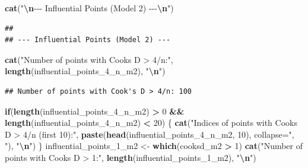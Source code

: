 \documentclass[
]{article}
\newenvironment{Shaded}{\begin{snugshade}}{\end{snugshade}}
\newcommand{\AttributeTok}[1]{\textcolor[rgb]{0.13,0.29,0.53}{#1}}
\newcommand{\ControlFlowTok}[1]{\textcolor[rgb]{0.13,0.29,0.53}{\textbf{#1}}}
\newcommand{\DecValTok}[1]{\textcolor[rgb]{0.00,0.00,0.81}{#1}}
\newcommand{\FunctionTok}[1]{\textcolor[rgb]{0.13,0.29,0.53}{\textbf{#1}}}
\newcommand{\NormalTok}[1]{#1}
\newcommand{\OtherTok}[1]{\textcolor[rgb]{0.56,0.35,0.01}{#1}}
\newcommand{\SpecialCharTok}[1]{\textcolor[rgb]{0.81,0.36,0.00}{\textbf{#1}}}
\newcommand{\StringTok}[1]{\textcolor[rgb]{0.31,0.60,0.02}{#1}}
\begin{document}
\begin{Shaded}
\begin{Highlighting}[]
    \FunctionTok{cat}\NormalTok{(}\StringTok{"}\SpecialCharTok{\textbackslash{}n}\StringTok{{-}{-}{-} Influential Points (Model 2) {-}{-}{-}}\SpecialCharTok{\textbackslash{}n}\StringTok{"}\NormalTok{)}
\end{Highlighting}
\end{Shaded}

\begin{verbatim}
## 
## --- Influential Points (Model 2) ---
\end{verbatim}

\begin{Shaded}
\begin{Highlighting}[]
    \FunctionTok{cat}\NormalTok{(}\StringTok{"Number of points with Cook\textquotesingle{}s D \textgreater{} 4/n:"}\NormalTok{, }\FunctionTok{length}\NormalTok{(influential\_points\_4\_n\_m2), }\StringTok{"}\SpecialCharTok{\textbackslash{}n}\StringTok{"}\NormalTok{)}
\end{Highlighting}
\end{Shaded}

\begin{verbatim}
## Number of points with Cook's D > 4/n: 100
\end{verbatim}

\begin{Shaded}
\begin{Highlighting}[]
    \ControlFlowTok{if}\NormalTok{(}\FunctionTok{length}\NormalTok{(influential\_points\_4\_n\_m2) }\SpecialCharTok{\textgreater{}} \DecValTok{0} \SpecialCharTok{\&\&} \FunctionTok{length}\NormalTok{(influential\_points\_4\_n\_m2) }\SpecialCharTok{\textless{}} \DecValTok{20}\NormalTok{) \{}
        \FunctionTok{cat}\NormalTok{(}\StringTok{"Indices of points with Cook\textquotesingle{}s D \textgreater{} 4/n (first 10):"}\NormalTok{, }\FunctionTok{paste}\NormalTok{(}\FunctionTok{head}\NormalTok{(influential\_points\_4\_n\_m2, }\DecValTok{10}\NormalTok{), }\AttributeTok{collapse=}\StringTok{", "}\NormalTok{), }\StringTok{"}\SpecialCharTok{\textbackslash{}n}\StringTok{"}\NormalTok{)}
\NormalTok{    \}}
\NormalTok{    influential\_points\_1\_m2 }\OtherTok{\textless{}{-}} \FunctionTok{which}\NormalTok{(cooksd\_m2 }\SpecialCharTok{\textgreater{}} \DecValTok{1}\NormalTok{)}
    \FunctionTok{cat}\NormalTok{(}\StringTok{"Number of points with Cook\textquotesingle{}s D \textgreater{} 1:"}\NormalTok{, }\FunctionTok{length}\NormalTok{(influential\_points\_1\_m2), }\StringTok{"}\SpecialCharTok{\textbackslash{}n}\StringTok{"}\NormalTok{)}
\end{Highlighting}
\end{Shaded}
\end{document}
